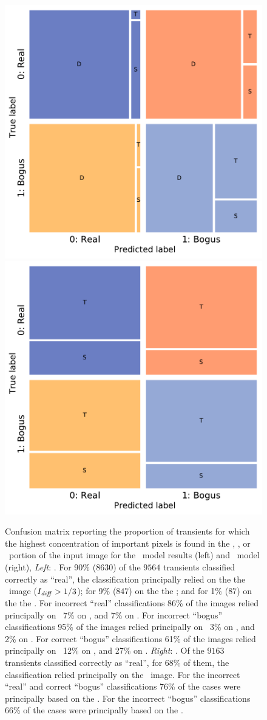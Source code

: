 


\begin{figure}
        \centering
    \includegraphics[width=0.45\linewidth]{
    figures/confusionmatrix_saliencyDIA_new.pdf}
     \includegraphics[width=0.45\linewidth]{
    figures/confusionmatrix_saliencynoDIA_new.pdf}
    \caption{Confusion matrix reporting the proportion of transients for which the highest concentration of important pixels is found in the \diff, \search, or \temp\ portion of the input image for the \diabased\ model results (left) and \nodia\ model (right), {\it Left}: \diabased. For 90\% ($8630$) of the $9564$ transients classified correctly as ``real'', the classification principally relied on the the \diff\ image ($I_{\it diff} > 1/3$); for 9\% ($847$) on the the \search ;  and for 1\% ($87$) on the the \temp . For incorrect ``real'' classifications 86\% of the images relied principally on \diff\, 7\% on \search, and 7\% on \temp. For incorrect ``bogus'' classifications 95\% of the images relied principally on \diff\, 3\% on \search, and 2\% on \temp. For correct ``bogus'' classifications 61\% of the images relied principally on \diff\, 12\% on \search, and 27\% on \temp. {\it Right}: \nodia. Of the $9163$ transients classified correctly as ``real'', for 68\% of them, the classification relied principally on the \temp\ image. For the incorrect ``real'' and correct ``bogus'' classifications 76\% of the cases were principally based on the \temp. For the incorrect ``bogus'' classifications 66\% of the cases were principally based on the \temp. }
    \label{fig:saliency_confusions}
\end{figure}

